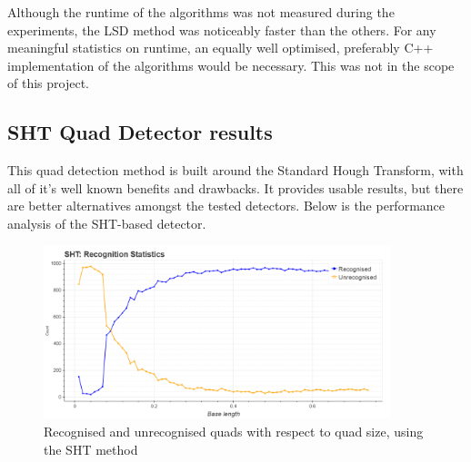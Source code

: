 Although the runtime of the algorithms was not measured during the experiments, the LSD method was noticeably faster than the others.
For any meaningful statistics on runtime, an equally well optimised, preferably C++ implementation of the algorithms would be necessary.
This was not in the scope of this project.

\clearpage\subsection{SHT Quad Detector results}

This quad detection method is built around the Standard Hough Transform, with all of it's well known benefits and drawbacks.
It provides usable results, but there are better alternatives amongst the tested detectors.
Below is the performance analysis of the SHT-based detector.

\begin{figure}[t]
	\centering
	\includegraphics[width=0.9\textwidth]{figures/plots/sht_rec_unrec_count.png}
	\caption{Recognised and unrecognised quads with respect to quad size, using the SHT method}
	\label{fig:shtRecCnt}
\end{figure}

